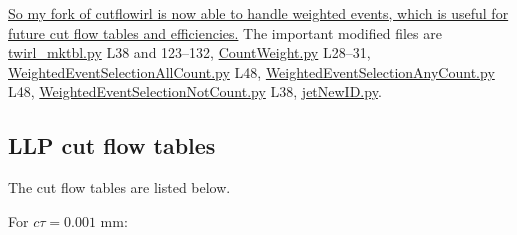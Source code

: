 \uline{So my fork of cutflowirl is now able to handle weighted events, which is useful for future cut flow tables and efficiencies.} The important modified files are \href{run:sec30/cutflowirl/twirl_mktbl.py}{twirl\_mktbl.py} L38 and 123--132, \href{run:sec30/cutflowirl/atlogic/EventSelectionModules/CountWeight.py}{CountWeight.py} L28--31, \href{run:sec30/cutflowirl/atlogic/EventSelectionModules/WeightedEventSelectionAllCount.py}{WeightedEventSelectionAllCount.py} L48, \href{run:sec30/cutflowirl/atlogic/EventSelectionModules/WeightedEventSelectionAnyCount.py}{WeightedEventSelectionAnyCount.py} L48, \href{run:sec30/cutflowirl/atlogic/EventSelectionModules/WeightedEventSelectionNotCount.py}{WeightedEventSelectionNotCount.py} L38, \href{run:sec30/cutflowirl/atlogic/Scribblers/jetNewID.py}{jetNewID.py}.


\subsection{LLP cut flow tables}

The cut flow tables are listed below.

For $c\tau = 0.001$ mm:

